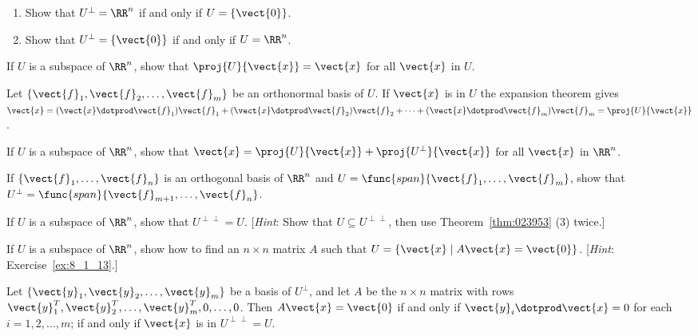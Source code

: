 \begin{multicols}{2}
\begin{ex}
\begin{enumerate}[label={\alph*.}]
\item Show that $U^\perp = \RR^n$ if and only if $U = \{\vect{0}\}$.

\item Show that $U^\perp = \{\vect{0}\}$ if and only if $U = \RR^n$.

\end{enumerate}
\end{ex}

\begin{ex}
If $U$ is a subspace of $\RR^n$, show that $\proj{U}{\vect{x}} = \vect{x}$ for all $\vect{x}$ in $U$.

\begin{sol}
Let $\{\vect{f}_{1}, \vect{f}_{2}, \dots , \vect{f}_{m}\}$ be an orthonormal basis of $U$. If $\vect{x}$ is in $U$ the expansion theorem gives $\vect{x} = (\vect{x} \dotprod \vect{f}_{1})\vect{f}_{1} + (\vect{x} \dotprod \vect{f}_{2})\vect{f}_{2} + \dots  + (\vect{x} \dotprod \vect{f}_{m})\vect{f}_{m} = \proj{U}{\vect{x}}$.
\end{sol}
\end{ex}

\begin{ex}
If $U$ is a subspace of $\RR^n$, show that $\vect{x} = \proj{U}{\vect{x}} + \proj{U^\perp}{\vect{x}}$ for all $\vect{x}$ in $\RR^n$.
\end{ex}

\begin{ex}
If $\{\vect{f}_{1}, \dots, \vect{f}_{n}\}$ is an orthogonal basis of $\RR^n$ and $U = \func{span}\{\vect{f}_{1}, \dots, \vect{f}_{m}\}$, show that \\ $U^\perp = \func{span}\{\vect{f}_{m + 1}, \dots, \vect{f}_{n}\}$.
\end{ex}

\begin{ex}\label{ex:8_1_13}
If $U$ is a subspace of $\RR^n$, show that $U^{\perp \perp} = U$. [\textit{Hint}: Show that $U \subseteq U^{\perp \perp}$, then use Theorem~\ref{thm:023953} (3) twice.]
\end{ex}

\begin{ex}
If $U$ is a subspace of $\RR^n$, show how to find an $n \times n$ matrix $A$ such that $U = \{\vect{x} \mid A\vect{x} = \vect{0}\}$. [\textit{Hint}: Exercise~\ref{ex:8_1_13}.]

\begin{sol}
Let $\{\vect{y}_{1}, \vect{y}_{2}, \dots, \vect{y}_{m}\}$ be a basis of $U^\perp$, and let $A$ be the $n \times n$ matrix with rows $\vect{y}^T_1, \vect{y}^T_2, \dots, \vect{y}^T_m, 0, \dots, 0$. Then $A\vect{x} = \vect{0}$ if and only if $\vect{y}_{i} \dotprod \vect{x} = 0$ for each $i = 1, 2, \dots, m$; if and only if $\vect{x}$ is in $U^{\perp \perp} = U$.
\end{sol}
\end{ex}


\end{multicols}
